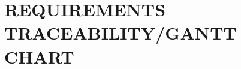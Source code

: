 \documentclass[letterpaper, 10pt, draftclsnofoot, onecolumn]{IEEEtran}
\begin{document}
{%




\clearpage\setcounter{page}{1}\pagestyle{Convertvi}
\section[REQUIREMENTS
TRACEABILITY]{\rmfamily\bfseries\color{black}
REQUIREMENTS TRACEABILITY/GANTT CHART}

\begin{comment}

{\selectlanguage{english}\itshape\color{black}
This section shall contain traceability information from each system
requirement in this specification to the system (or subsystem, if
applicable) requirements it addresses. \ A tabular form is preferred,
but not mandatory.}


\bigskip


\end{comment}}
\end{document}
